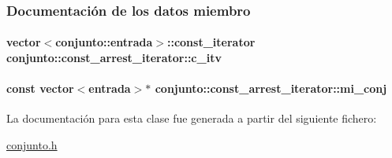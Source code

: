 \subsubsection{Documentación de los datos miembro}
\hypertarget{classconjunto_1_1const__arrest__iterator_a3240c715891b3cd5ecf77e8747043fc9}{
\paragraph[{c\-\_\-itv}]{\setlength{\rightskip}{0pt plus 5cm}vector$<${\bf conjunto\-::entrada}$>$\-::{\bf const\-\_\-iterator} conjunto\-::const\-\_\-arrest\-\_\-iterator\-::c\-\_\-itv\hspace{0.3cm}{\ttfamily [private]}}}\label{classconjunto_1_1const__arrest__iterator_a3240c715891b3cd5ecf77e8747043fc9}
\hypertarget{classconjunto_1_1const__arrest__iterator_a1bb0ece70b2a5986b1f17b2a54493272}{
\paragraph[{mi\-\_\-conj}]{\setlength{\rightskip}{0pt plus 5cm}const vector$<${\bf entrada}$>$$\ast$ conjunto\-::const\-\_\-arrest\-\_\-iterator\-::mi\-\_\-conj\hspace{0.3cm}{\ttfamily [private]}}}\label{classconjunto_1_1const__arrest__iterator_a1bb0ece70b2a5986b1f17b2a54493272}


La documentación para esta clase fue generada a partir del siguiente fichero\-:\begin{DoxyCompactItemize}
\item 
\hyperlink{conjunto_8h}{conjunto.\-h}\end{DoxyCompactItemize}
